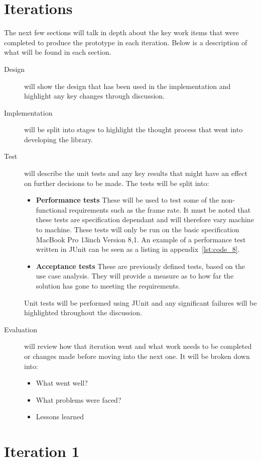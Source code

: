 \documentclass[11pt,oneside]{report}
\begin{document}
	\section{Iterations}
		The next few sections will talk in depth about the key work items that were completed to produce the prototype in each iteration.
		Below is a description of what will be found in each section.
		\begin{description}
		\item[Design] will show the design that has been used in the implementation and highlight any key changes through discussion.
		\item[Implementation] will be split into stages to highlight the thought process that went into developing the library.
		\item[Test] will describe the unit tests and any key results that might have an effect on further decisions to be made.
		The tests will be split into:
			\begin{itemize}
				\item \textbf{Performance tests} These will be used to test some of the non-functional requirements such as the frame rate. 
				It must be noted that these tests are specification dependant and will therefore vary machine to machine.
				These tests will only be run on the basic specification MacBook Pro 13inch Version 8,1.
				An example of a performance test written in JUnit can be seen as a listing in appendix~\ref{lst:code_8}.
				\item \textbf{Acceptance tests} These are previously defined tests, based on the use case analysis.
				They will provide a measure as to how far the solution has gone to meeting the requirements.
			\end{itemize}
			Unit tests will be performed using JUnit and any significant failures will be highlighted throughout the discussion.
		\item[Evaluation] will review how that iteration went and what work needs to be completed or changes made before moving into the next one. It will be broken down into:
			\begin{itemize}
				\item{What went well?}
				\item{What problems were faced?}
				\item{Lessons learned}	
			\end{itemize}
		\end{description}
	\section{Iteration 1}\label{sec:p1}
\end{document}
